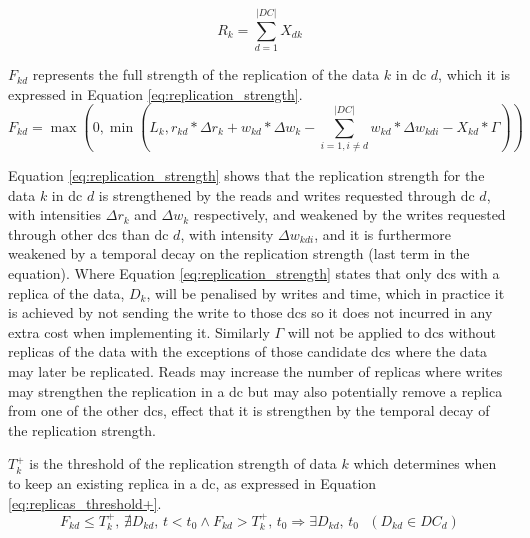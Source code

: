 \documentclass[english]{article}
\begin{document}
\begin{equation} \label{eq:num_replicas}
R_{k} = \sum^{|DC|}_{d = 1} X_{dk}
\end{equation}

$F_{kd}$ represents the full strength of the replication of the data $k$ in \gls{dc} $d$, which it is expressed in Equation \ref{eq:replication_strength}.
\begin{equation}  \label{eq:replication_strength}
	 F_{kd} = \max(0, \min(L_{k}, r_{kd} * \Delta r_{k} + w_{kd} * \Delta w_{k} - \sum^{|DC|}_{i = 1, i \neq d} w_{kd} * \Delta w_{kdi} - X_{kd} * \Gamma))
\end{equation}


Equation \ref{eq:replication_strength} shows that the replication strength for the data $k$ in \gls{dc} $d$ is strengthened by the reads and writes requested through \gls{dc} $d$, with intensities $\Delta r_{k}$ and $\Delta w_{k}$ respectively, and weakened  by the writes requested through other \glspl{dc} than \gls{dc} $d$, with intensity $\Delta w_{kdi}$, and it is furthermore weakened by a temporal decay on the replication strength (last term in the equation). Where Equation \ref{eq:replication_strength} states that only \glspl{dc} with a replica of the data, $D_{k}$, will be penalised by writes and time, which in practice it is achieved by not sending the write to those \glspl{dc} so it does not incurred in any extra cost when implementing it. Similarly $\Gamma$ will not be applied to \glspl{dc} without replicas of the data with the exceptions of those candidate \glspl{dc} where the data may later be replicated. Reads may increase the number of replicas where writes may strengthen the replication in a \gls{dc} but may also potentially remove a replica from one of the other \glspl{dc}, effect that it is strengthen by the temporal decay of the replication strength.

$T^{+}_{k}$ is the threshold of the replication strength of data $k$ which determines when to keep an existing replica in a \gls{dc}, as expressed in Equation \ref{eq:replicas_threshold+}.
\begin{equation} \label{eq:replicas_threshold+}
	F_{kd} \le T^{+}_{k} \text{, } \nexists D_{kd} \text{, } t < t_{0}  \wedge F_{kd} > T^{+}_{k} \text{, } t_{0} \Longrightarrow \exists D_{kd} \text{, } t_{0} \text{ } (D_{kd} \in DC_{d})
\end{equation}
\end{document}
